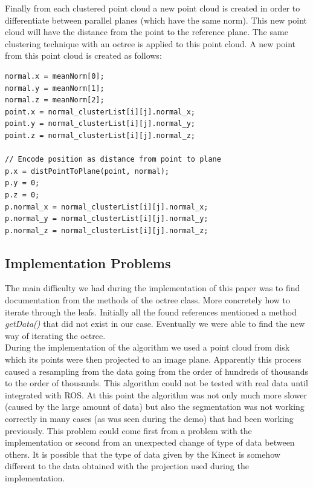 \documentclass[fontsize=12pt]{article}
\begin{document}
Finally from each clustered point cloud a new point cloud is created in order to differentiate between parallel planes (which have the same norm). This new point cloud will have the distance from the point to the reference plane. The same clustering technique with an octree is applied to this point cloud. A new point from this point cloud is created as follows:

\begin{lstlisting}
normal.x = meanNorm[0];
normal.y = meanNorm[1];
normal.z = meanNorm[2];
point.x = normal_clusterList[i][j].normal_x;
point.y = normal_clusterList[i][j].normal_y;
point.z = normal_clusterList[i][j].normal_z;

// Encode position as distance from point to plane
p.x = distPointToPlane(point, normal);
p.y = 0;
p.z = 0;
p.normal_x = normal_clusterList[i][j].normal_x;
p.normal_y = normal_clusterList[i][j].normal_y;
p.normal_z = normal_clusterList[i][j].normal_z;
\end{lstlisting}

\subsection{Implementation Problems}
\label{sub:implementation_problems}

The main difficulty we had during the implementation of this paper was to find documentation from the methods of the octree class. More concretely how to iterate through the leafs. Initially all the found references mentioned a method \textit{getData()} that did not exist in our case. Eventually we were able to find the new way of iterating the octree.\\

During the implementation of the algorithm we used a point cloud from disk which its points were then projected to an image plane.  Apparently this process caused a resampling from the data going from the order of hundreds of thousands to the order of thousands. This algorithm could not be tested with real data until integrated with ROS. At this point the algorithm was not only much more slower (caused by the large amount of data) but also the segmentation was not working correctly in many cases (as was seen during the demo) that had been working previously. This problem could come first from a problem with the implementation or second from an unexpected change of type of data between others. It is possible that the type of data given by the Kinect is somehow different to the data obtained with the projection used during the implementation. \\
\end{document}
